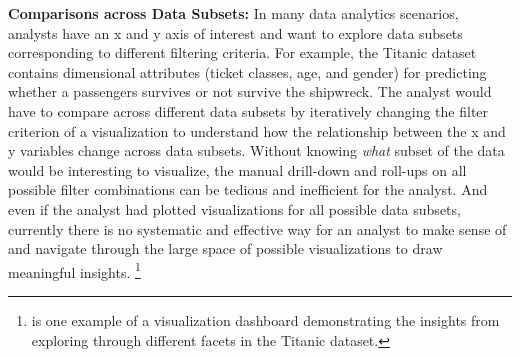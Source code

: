 \npar \textbf{Comparisons across Data Subsets:} In many data analytics scenarios, analysts have an x and y axis of interest and want to explore data subsets corresponding to different filtering criteria. For example, the Titanic dataset contains dimensional attributes (ticket classes, age, and gender) for predicting whether a passengers survives or not survive the shipwreck. The analyst would have to compare across different data subsets by iteratively changing the filter criterion of a visualization to understand how the relationship between the x and y variables change across data subsets.
\npar Without knowing \textit{what} subset of the data would be interesting to visualize, the manual drill-down and roll-ups on all possible filter combinations can be tedious and inefficient for the analyst. And even if the analyst had plotted visualizations for all possible data subsets, currently there is no systematic and effective way for an analyst to make sense of and navigate through the large space of possible visualizations to draw meaningful insights. \footnote{\cite{anand} is one example of a visualization dashboard demonstrating the insights from exploring through different facets in the Titanic dataset.}

